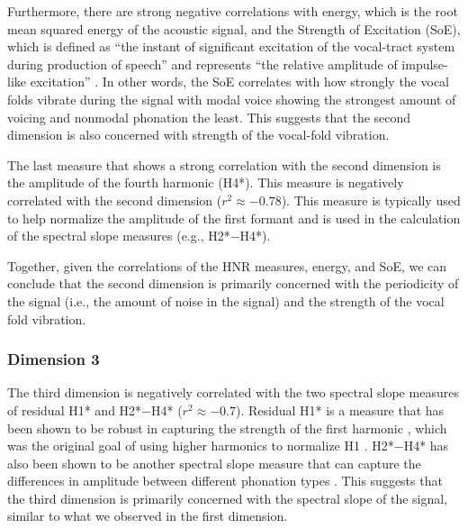 Furthermore, there are strong negative correlations with energy, which is the root mean squared energy of the acoustic signal, and the Strength of Excitation (SoE), which is defined as ``the instant of significant excitation of the vocal-tract system during production of speech'' and represents ``the relative amplitude of impulse-like excitation'' \citep[1934]{mittalStudyEffectsVocal2014}. In other words, the SoE correlates with how strongly the vocal folds vibrate during the signal with modal voice showing the strongest amount of voicing and nonmodal phonation the least. This suggests that the second dimension is also concerned with strength of the vocal-fold vibration.

The last measure that shows a strong correlation with the second dimension is the amplitude of the fourth harmonic (H4*). This measure is negatively correlated with the second dimension ($r^{2} \approx -0.78$). This measure is typically used to help normalize the amplitude of the first formant and is used in the calculation of the spectral slope measures (e.g., H2*$-$H4*).

Together, given the correlations of the HNR measures, energy, and SoE, we can conclude that the second dimension is primarily concerned with the periodicity of the signal (i.e., the amount of noise in the signal) and the strength of the vocal fold vibration.

\subsubsection{Dimension 3} \label{sec:acousticlandscape:dim3}
The third dimension is negatively correlated with the two spectral slope measures of residual H1* and H2*$-$H4* ($r^{2} \approx -0.7$). Residual H1* is a measure that has been shown to be robust in capturing the strength of the first harmonic \citep{chaiH1H2AcousticMeasure2022,brinkerhoffUsingResidualH12025}, which was the original goal of using higher harmonics to normalize H1 \citep{fischer-jorgensenPhoneticAnalysisBreathy1968}. H2*$-$H4* has also been shown to be another spectral slope measure that can capture the differences in amplitude between different phonation types \citep{garellekPhoneticsVoice2019,garellekModelingVoiceSource2016,kreimanUnifiedTheoryVoice2014,kreimanValidatingPsychoacousticModel2021}. This suggests that the third dimension is primarily concerned with the spectral slope of the signal, similar to what we observed in the first dimension.

